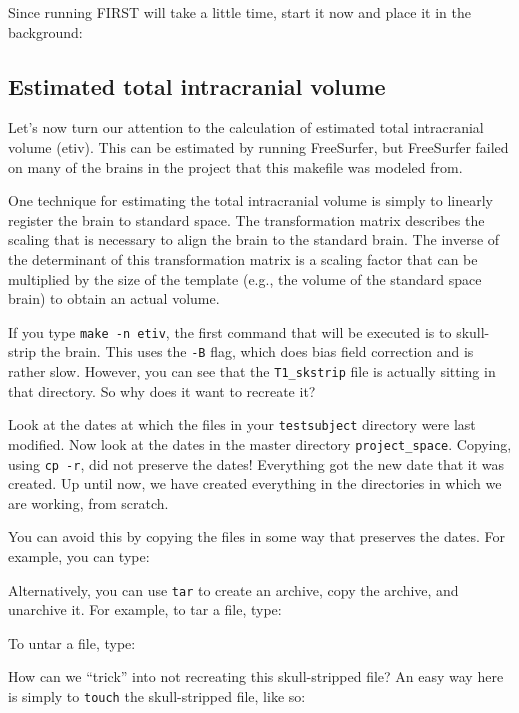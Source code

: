 Since running FIRST will take a little time, start it now and place it in the background:

\subsection{Estimated total intracranial volume}
Let's now turn our attention to the calculation of estimated total intracranial volume (etiv). This can be estimated by running FreeSurfer, but FreeSurfer failed on many of the brains in the project that this makefile was modeled from.

One technique for estimating the total intracranial volume is simply
to linearly register the brain to standard space. The transformation
matrix describes the scaling that is necessary to align the brain to
the standard brain. The inverse of the determinant of this
transformation matrix is a scaling factor that can be multiplied by the size of the template (e.g., the volume of the standard space brain) to obtain an actual volume.

If you type \texttt{make -n etiv}, the first command that will be executed is to skull-strip the brain. This uses the \texttt{-B} flag, which does bias field correction and is rather slow. However, you can see that the \texttt{T1_skstrip} file is actually sitting in that directory. So why does it want to recreate it?

Look at the dates at which the files in your \texttt{testsubject} directory were last modified. Now look at the dates in the master directory \texttt{project_space}. Copying, using \texttt{cp -r}, did not preserve the dates! Everything got the new date that it was created. Up until now, we have created everything in the directories in which we are working, from scratch. 

You can avoid this by copying the files in some way that preserves the dates. For example,
you can type:

Alternatively, you can use \texttt{tar} to create an archive, copy the archive, and unarchive it.
For example, to tar a file, type:

To untar a file, type:

How can we ``trick'' \maken{} into not recreating this skull-stripped file? An easy way here is simply to \texttt{touch} the skull-stripped file, like so:

